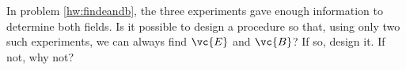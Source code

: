         In problem \ref{hw:findeandb}, the three experiments gave enough
        information to determine both fields.
        Is it possible to design a procedure so that, using only two such experiments,
        we can always find $\vc{E}$ and $\vc{B}$? If so, design it. If not, why not?
